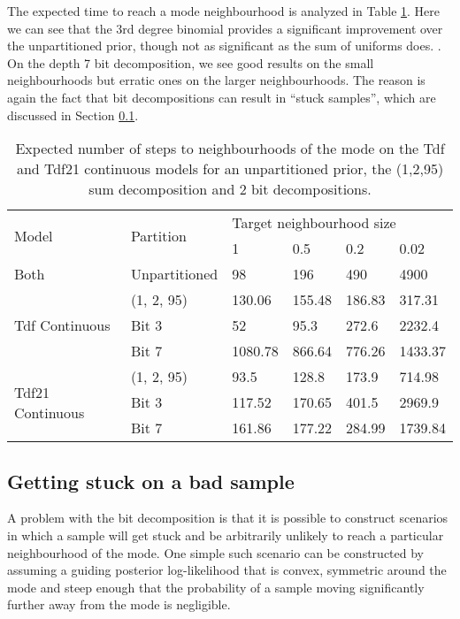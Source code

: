 The expected time to reach a mode neighbourhood is analyzed in Table \ref{tab:bestParts}. Here we can see that the 3rd degree binomial provides a significant improvement over the unpartitioned prior, though not as significant as the sum of uniforms does. . On the depth 7 bit decomposition, we see good results on the small neighbourhoods but erratic ones on the larger neighbourhoods. The reason is again the fact that bit decompositions can result in ``stuck samples'', which are discussed in Section \ref{sect:stuckSamples}.

\begin{table}[H]
  \centering
  \begin{tabular}{llllll}
    \toprule
    \multirow{2}{*}{Model} & \multirow{2}{*}{Partition} & \multicolumn{4}{l}{Target neighbourhood size} \\
    \cmidrule(r){3-6} 
    & & 1 & 0.5 & 0.2 & 0.02 \\
    \midrule
    Both & Unpartitioned & 98 & 196 & 490 & 4900 \\
    \midrule
    \multirow{3}{*}{Tdf Continuous} & (1, 2, 95) & 130.06 & 155.48  & 186.83 & 317.31 \\
    & Bit 3 & 52 & 95.3  & 272.6 & 2232.4 \\
    & Bit 7 & 1080.78 & 866.64 & 776.26 & 1433.37 \\
    \midrule
    \multirow{3}{*}{Tdf21 Continuous} & (1, 2, 95) & 93.5 & 128.8  & 173.9 & 714.98 \\
    & Bit 3 & 117.52 & 170.65  & 401.5 & 2969.9 \\
    & Bit 7 & 161.86 & 177.22 & 284.99 & 1739.84 \\
    \bottomrule
  \end{tabular}
  \caption{Expected number of steps to neighbourhoods of the mode on the Tdf and Tdf21 continuous models for an unpartitioned prior, the (1,2,95) sum decomposition and 2 bit decompositions.}
  \label{tab:bestParts}
\end{table}

\subsection{Getting stuck on a bad sample}
\label{sect:stuckSamples}
A problem with the bit decomposition is that it is possible to construct scenarios in which a sample will get stuck and be arbitrarily unlikely to reach a particular neighbourhood of the mode. One simple such scenario can be constructed by assuming a guiding posterior log-likelihood that is convex, symmetric around the mode and steep enough that the probability of a sample moving significantly further away from the mode is negligible.

